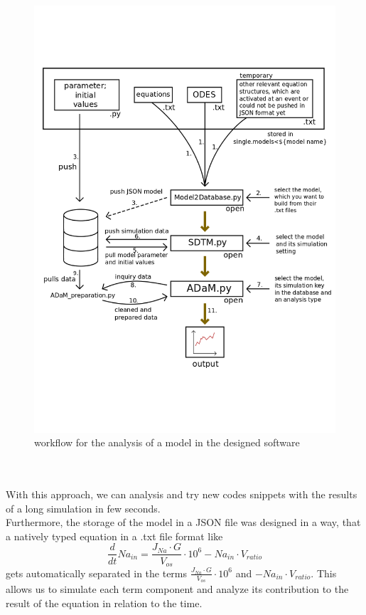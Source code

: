 \begin{figure}[h!]
	\begin{center}
		\begin{minipage}{0,8\textwidth}
			
			\includegraphics[width=\textwidth]{picture/proposedWorkflow.png}
			\caption{workflow for the analysis of a model in the designed software} 
			\label{proposedWorkflow} 
		\end{minipage}
	\end{center}
\end{figure}\\\\
With this approach, we can analysis and try new codes snippets with the results of a long simulation in few seconds. \\
Furthermore, the storage of the model in a JSON file was designed in a way, that a natively typed equation in a .txt file format like 
\begin{equation*}
	\frac{d}{dt} Na_{in} = \frac{J_{Na} \cdot G}{V_{os}} \cdot 10^6 - Na_{in} \cdot V_{ratio} 
\end{equation*}
gets automatically separated in the terms $\frac{J_{Na} \cdot G}{V_{os}} \cdot 10^6$ and $- Na_{in} \cdot V_{ratio}$. This allows us to simulate each term component and analyze its contribution to the result of the equation in relation to the time.\\
\newpage